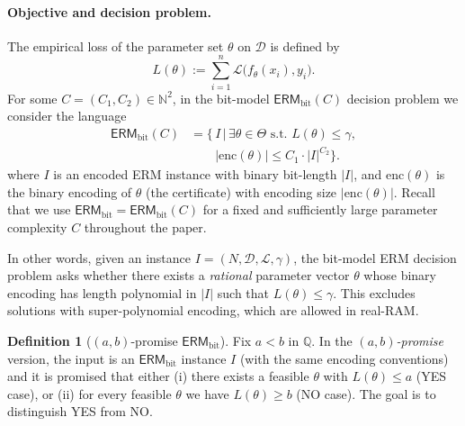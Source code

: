 \documentclass{article}
\newcommand{\cL}{\mathcal{L}}
\newcommand{\cD}{\mathcal{D}}
\theoremstyle{plain}
\theoremstyle{definition}
\newtheorem{definition}[theorem]{Definition}
\theoremstyle{remark}
\begin{document}
\paragraph{Objective and decision problem.}
The empirical loss of the parameter set $\theta$ on $\cD$ is defined by
$$
L(\theta) := \sum_{i=1}^n \cL\bigl(f_\theta(x_i), y_i\bigr).
$$
For some $C = (C_1,C_2) \in \mathbb{N}^2$, in the bit-model $\mathsf{ERM}_{\text{bit}}(C)$ decision problem we consider the language
\begin{equation*}
	\begin{aligned}
		\mathsf{ERM}_{\text{bit}}(C)
		&= \bigl\{\, I \,\big|\, \exists \theta\in \Theta
		\text{ s.t. } L(\theta)\le\gamma,\\
		&\qquad |\mathrm{enc}(\theta)| \le C_1 \cdot |I|^{C_2} \bigr\}.
	\end{aligned}
\end{equation*}
where $I$ is an encoded ERM instance with binary bit-length $|I|$, and
$\mathrm{enc}(\theta)$ is the binary encoding of $\theta$
(the certificate) with encoding size $|\mathrm{enc}(\theta)|$. Recall that we use $\mathsf{ERM}_{\text{bit}} = \mathsf{ERM}_{\text{bit}}(C)$ for a fixed and sufficiently large parameter complexity $C$ throughout the paper.


In other words, given an instance $I=(N,\cD,\cL,\gamma)$, the bit-model ERM decision problem asks whether there exists a
\emph{rational} parameter vector $\theta$ whose binary encoding has length polynomial in $|I|$ such that
$L(\theta)\le\gamma$. This excludes solutions with super-polynomial encoding, which are allowed in real-RAM.

\begin{definition}[$(a,b)$-promise $\mathsf{ERM}_{\text{bit}}$]
\label{def:ermbit-promise}
Fix $a<b$ in $\mathbb{Q}$. In the \emph{$(a,b)$-promise} version, the input is an $\mathsf{ERM}_{\text{bit}}$ instance
$I$ (with the same encoding conventions) and it is promised that either
(i) there exists a feasible $\theta$ with $L(\theta)\le a$ (YES case), or
(ii) for every feasible $\theta$ we have $L(\theta)\ge b$ (NO case).
The goal is to distinguish YES from NO.
\end{definition}
\end{document}
